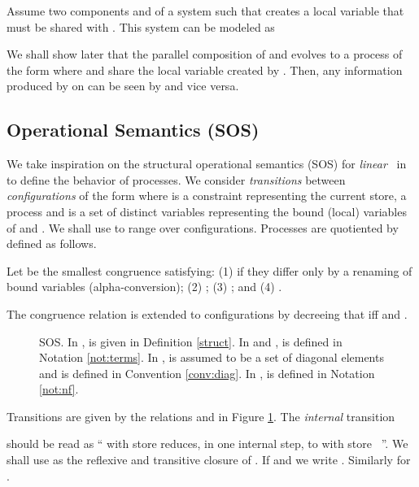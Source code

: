 \documentclass{tlp}
\begin{document}
\begin{example}\label{ex:mobility}
Assume two components   and  of a system such that  creates
a local variable that must be shared with . This system can be modeled
as

We shall show later that the parallel composition of
 and  evolves to a process of the form
 where  and  share the local variable  created by .
Then, any information produced by  on  can be seen by  and
vice versa. 
\end{example}



\subsection{Operational Semantics (SOS)}\label{sec:opersem}
We take inspiration on the structural operational semantics (SOS)  for {\em linear} \ccp\ in \cite{DBLP:journals/iandc/FagesRS01,DBLP:conf/fsttcs/HaemmerleFS07} to 
define the behavior of processes.  We consider \emph{transitions}  between \emph{configurations} of the form   
where  is a constraint representing the current store,  a process and  is a set of distinct variables representing the  bound
(local) variables of  and .
  We shall use  to range over configurations.  Processes 
 are  quotiented by  defined as follows. 
\begin{definition}\label{struct} Let 
be the smallest congruence  satisfying:  
(1)   if they differ only by a renaming of bound variables (alpha-conversion); (2)  ; (3)  ; and  (4)  .
\end{definition}
The congruence relation  is extended to configurations by decreeing that  iff 
   and . 
\begin{figure}
\caption{\label{opersem} 
SOS.  In ,  is given in 
Definition \ref{struct}. 
In  and ,   is defined in Notation \ref{not:terms}. In ,  is assumed to be a set of diagonal elements and  is defined in Convention \ref{conv:diag}. In ,  is defined in Notation \ref{not:nf}. 
}
\end{figure}



Transitions are given by the relations  and   in Figure \ref{opersem}.   The \emph{internal} transition 

  should be read as ``  with store  reduces, in one internal step, to   with store \ ''. We shall use  as the reflexive and transitive closure of . If  and  we write . Similarly for . 
\end{document}
